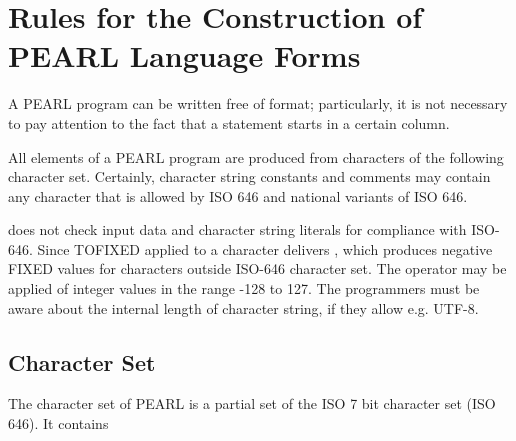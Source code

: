 \chapter{Rules for the Construction of PEARL Language Forms}   %

A PEARL program can be written free of format; particularly, it is not
necessary to pay attention to the fact that a statement starts in a
certain column.

All elements of a PEARL program are produced from characters of the
following character set. Certainly, character string constants and
comments may contain any character that is allowed by ISO 646 and
national variants of ISO 646.

\OpenPEARL{} does not check input data and character string literals 
for compliance with ISO-646. 
Since TOFIXED applied to a character delivers , which produces
 negative FIXED values for characters outside ISO-646 character set.
The operator  may be applied of integer values in the 
range -128 to 127.
The programmers must be aware about the internal length of character string,
 if they allow e.g. UTF-8.

\section{Character Set}   %

The character set of PEARL is a partial set of the ISO 7 bit character
set (ISO 646). It contains

